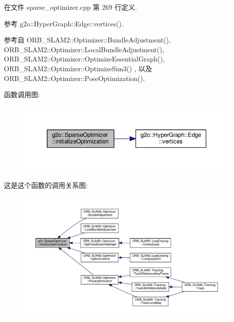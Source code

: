 在文件 sparse\-\_\-optimizer.\-cpp 第 269 行定义.



参考 g2o\-::\-Hyper\-Graph\-::\-Edge\-::vertices().



参考自 O\-R\-B\-\_\-\-S\-L\-A\-M2\-::\-Optimizer\-::\-Bundle\-Adjustment(), O\-R\-B\-\_\-\-S\-L\-A\-M2\-::\-Optimizer\-::\-Local\-Bundle\-Adjustment(), O\-R\-B\-\_\-\-S\-L\-A\-M2\-::\-Optimizer\-::\-Optimize\-Essential\-Graph(), O\-R\-B\-\_\-\-S\-L\-A\-M2\-::\-Optimizer\-::\-Optimize\-Sim3() , 以及 O\-R\-B\-\_\-\-S\-L\-A\-M2\-::\-Optimizer\-::\-Pose\-Optimization().



函数调用图\-:
\nopagebreak
\begin{figure}[H]
\begin{center}
\leavevmode
\includegraphics[width=350pt]{classg2o_1_1SparseOptimizer_a56c0c13954ac7204cfb031c141ece9ae_cgraph}
\end{center}
\end{figure}




这是这个函数的调用关系图\-:
\nopagebreak
\begin{figure}[H]
\begin{center}
\leavevmode
\includegraphics[width=350pt]{classg2o_1_1SparseOptimizer_a56c0c13954ac7204cfb031c141ece9ae_icgraph}
\end{center}
\end{figure}


